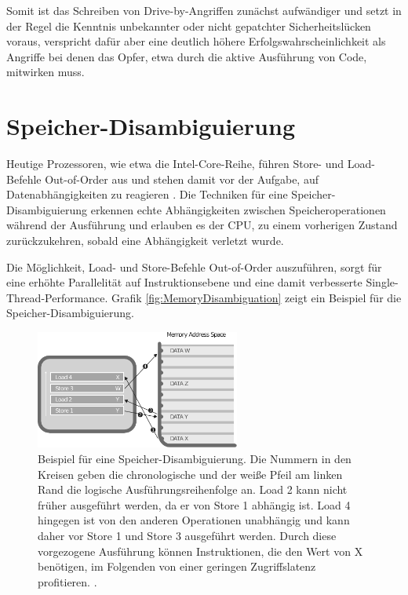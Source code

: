 Somit ist das Schreiben von Drive-by-Angriffen zunächst aufwändiger und setzt in der Regel die Kenntnis unbekannter oder nicht gepatchter Sicherheitslücken voraus, verspricht dafür aber eine deutlich höhere Erfolgswahrscheinlichkeit als Angriffe bei denen das Opfer, etwa durch die aktive Ausführung von Code, mitwirken muss.




\section{Speicher-Disambiguierung}

Heutige Prozessoren, wie etwa die Intel-Core-Reihe, führen Store- und Load-Befehle Out-of-Order aus und stehen damit vor der Aufgabe, auf Datenabhängigkeiten 
zu reagieren \cite{memoryDisambiguationBlog}.
Die Techniken für eine Speicher-Disambiguierung erkennen echte Abhängigkeiten zwischen Speicheroperationen während der Ausführung und erlauben es der CPU, zu einem vorherigen Zustand zurückzukehren, sobald eine Abhängigkeit verletzt wurde.

Die Möglichkeit, Load- und Store-Befehle Out-of-Order auszuführen, sorgt für eine erhöhte Parallelität auf Instruktionsebene und eine damit verbesserte Single-Thread-Performance.
Grafik \ref{fig:MemoryDisambiguation} zeigt ein Beispiel für die Speicher-Disambiguierung. 

\label{fig:MemoryDisambiguation}
\begin{figure}[h]
\centering
\includegraphics[width=0.6\textwidth]{methods/grayscale_memory_disambiguation.pdf}
\caption{Beispiel für eine Speicher-Disambiguierung. Die Nummern in den Kreisen geben die chronologische und der weiße Pfeil am linken Rand die logische Ausführungsreihenfolge an. Load 2 kann nicht früher ausgeführt werden, da er von Store 1 abhängig ist. Load 4 hingegen ist von den anderen Operationen unabhängig und kann daher vor Store 1 und Store 3 ausgeführt werden. Durch diese vorgezogene Ausführung können Instruktionen, die den Wert von X benötigen, im Folgenden von einer geringen Zugriffslatenz profitieren. \cite{CacheAssoWiki}.}
\end{figure}

